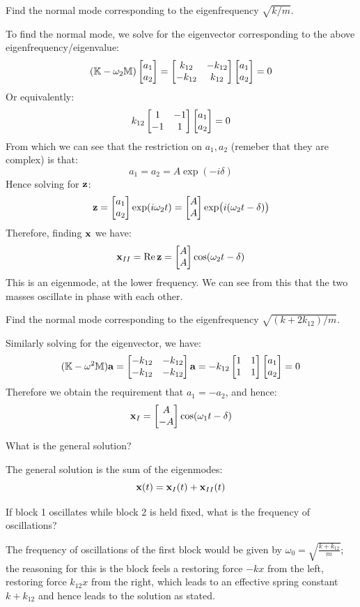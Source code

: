 \begin{p}
Find the normal mode corresponding to the eigenfrequency $\sqrt{k/m}$.
\end{p}
\begin{s}
To find the normal mode, we solve for the eigenvector corresponding to the above eigenfrequency/eigenvalue:
\[(\mathbb{K} - \omega_2\mathbb{M})\begin{bmatrix}a_1 \\ a_2\end{bmatrix} = \begin{bmatrix}k_{12} & - k_{12} \\ -k_{12} & k_{12}\end{bmatrix}\begin{bmatrix}a_1 \\ a_2\end{bmatrix} = 0\]
Or equivalently:
\[k_{12}\begin{bmatrix}1 & -1 \\ -1 & 1\end{bmatrix}\begin{bmatrix}a_1 \\ a_2\end{bmatrix} = 0\]
From which we can see that the restriction on $a_1, a_2$ (remeber that they are complex) is that:
\[a_1 = a_2 = A\exp(-i\delta)\]
Hence solving for $\mathbf{z}$:
\[\mathbf{z} = \begin{bmatrix}a_1 \\ a_2\end{bmatrix}\exp(i\omega_2 t) = \begin{bmatrix}A \\ A\end{bmatrix}\exp(i(\omega_2 t - \delta))\]
Therefore, finding $\mathbf{x}$ we have:
\[\mathbf{x}_{II} = \Re\mathbf{z} = \begin{bmatrix}A \\ A\end{bmatrix}\cos(\omega_2 t - \delta)\]
This is an eigenmode, at the lower frequency. We can see from this that the two masses oscillate in phase with each other.
\end{s}

\begin{p}
Find the normal mode corresponding to the eigenfrequency $\sqrt{(k+2k_{12})/m}$.
\end{p}
\begin{s}
Similarly solving for the eigenvector, we have:
\[(\mathbb{K} - \omega^2\mathbb{M})\mathbf{a} = \begin{bmatrix}-k_{12} & -k_{12} \\ -k_{12} & -k_{12}\end{bmatrix}\mathbf{a} = -k_{12}\begin{bmatrix}1 & 1 \\ 1 & 1\end{bmatrix}\begin{bmatrix}a_1 \\ a_2\end{bmatrix} = 0\]
Therefore we obtain the requirement that $a_1 = -a_2$, and hence:
\[\mathbf{x}_I = \begin{bmatrix}A \\ -A\end{bmatrix}\cos(\omega_1 t - \delta)\]
\end{s}

\begin{p}
What is the general solution?
\end{p}
\begin{s}
The general solution is the sum of the eigenmodes:
\[\mathbf{x}(t) = \mathbf{x}_I(t) + \mathbf{x}_{II}(t)\]
\end{s}

\begin{p}
If block 1 oscillates while block 2 is held fixed, what is the frequency of oscillations?
\end{p}
\begin{s}
The frequency of oscillations of the first block would be given by $\omega_0 = \sqrt{\frac{k + k_{12}}{m}}$; the reasoning for this is the block feels a restoring force $-kx$ from the left, restoring force $k_{12}x$ from the right, which leads to an effective spring constant $k + k_{12}$ and hence leads to the solution as stated.
\end{s}

